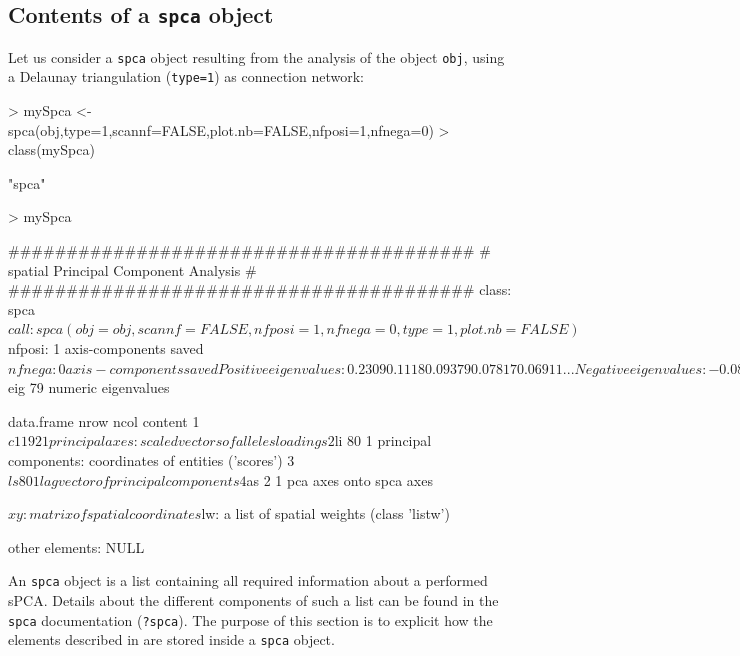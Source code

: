 \documentclass{article}
\begin{document}
\subsection{Contents of a \texttt{spca} object}
Let us consider a \texttt{spca} object resulting from the analysis of
the object \texttt{obj}, using a Delaunay triangulation (\texttt{type=1}) as connection network:
\begin{Schunk}
\begin{Sinput}
> mySpca <- spca(obj,type=1,scannf=FALSE,plot.nb=FALSE,nfposi=1,nfnega=0)
> class(mySpca)
\end{Sinput}
\begin{Soutput}
[1] "spca"
\end{Soutput}
\begin{Sinput}
> mySpca
\end{Sinput}
\begin{Soutput}
	########################################
	# spatial Principal Component Analysis #
	########################################
class: spca
$call: spca(obj = obj, scannf = FALSE, nfposi = 1, nfnega = 0, type = 1, 
    plot.nb = FALSE)

$nfposi: 1 axis-components saved
$nfnega: 0 axis-components saved
Positive eigenvalues: 0.2309 0.1118 0.09379 0.07817 0.06911 ...
Negative eigenvalues: -0.08421 -0.07376 -0.06978 -0.06648 -0.06279 ...

  vector length mode    content    
1 $eig   79     numeric eigenvalues

  data.frame nrow ncol content                                                 
1 $c1        192  1    principal axes: scaled vectors of alleles loadings      
2 $li        80   1    principal components: coordinates of entities ('scores')
3 $ls        80   1    lag vector of principal components                      
4 $as        2    1    pca axes onto spca axes                                 

$xy: matrix of spatial coordinates
$lw: a list of spatial weights (class 'listw')

other elements: NULL
\end{Soutput}
\end{Schunk}

\noindent An \texttt{spca} object is a list containing all required
information about a performed sPCA.
Details about the different components of such a list can be found in
the \texttt{spca} documentation (\texttt{?spca}).
The purpose of this section is to explicit how the elements described
in \cite{tjart04} are stored inside a \texttt{spca} object.
\end{document}
